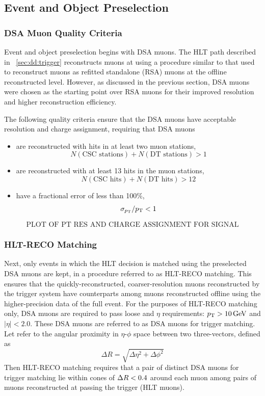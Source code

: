 \subsection{Event and Object Preselection}
\subsubsection{DSA Muon Quality Criteria}
\label{sec:dd:DSAQuality}
Event and object preselection begins with DSA muons.
The HLT path described in \Sec~\ref{sec:dd:trigger} reconstructs muons at \Ltwo using a procedure similar to that used to reconstruct muons as refitted standalone (RSA) muons at the offline reconstructed level.
However, as discussed in the previous section, DSA muons were chosen as the starting point over RSA muons for their improved \pT resolution and higher reconstruction efficiency.

The following quality criteria ensure that the DSA muons have acceptable \pT resolution and charge assignment, requiring that DSA muons
\begin{itemize}
  \item are reconstructed with hits in at least two muon stations, \ie $$N(\text{CSC stations}) + N(\text{DT stations}) > 1$$
  \item are reconstructed with at least 13 hits in the muon stations, \ie $$N(\text{CSC hits}) + N(\text{DT hits}) > 12$$
  \item have a fractional \pT error of less than 100\%, \ie $$\sigma_{p_{\mathrm{T}}}/p_{\mathrm{T}} < 1$$
\end{itemize}

$$\text{PLOT OF PT RES AND CHARGE ASSIGNMENT FOR SIGNAL}$$

\subsubsection{HLT-RECO Matching}
Next, only events in which the HLT decision is matched using the preselected DSA muons are kept, in a procedure referred to as HLT-RECO matching.
This ensures that the quickly-reconstructed, coarser-resolution muons reconstructed by the trigger system have counterparts among muons reconstructed offline using the higher-precision data of the full event.
For the purposes of HLT-RECO matching only, DSA muons are required to pass loose \pT and $\eta$ requirements: $p_{\mathrm{T}} > 10\,\text{Ge\hspace{-.08em}V}$ and $|\eta| < 2.0$.
These DSA muons are referred to as DSA muons for trigger matching.
Let \deltaR refer to the angular proximity in $\eta$-$\phi$ space between two three-vectors, defined as
\begin{equation}
  \Delta R = \sqrt{\Delta\eta^2 + \Delta\phi^2}
  \label{eq:dd:deltaR}
\end{equation}
Then HLT-RECO matching requires that a pair of distinct DSA muons for trigger matching lie within cones of $\Delta R < 0.4$ around each muon among pairs of muons reconstructed at \Ltwo passing the trigger (HLT muons).

